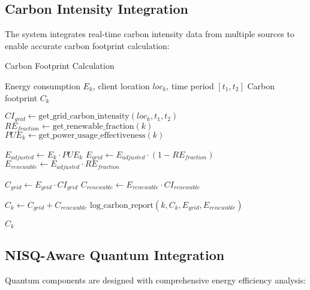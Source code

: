 \documentclass[10pt,journal,compsoc]{IEEEtran}
\begin{document}
\subsection{Carbon Intensity Integration}

The system integrates real-time carbon intensity data from multiple sources to enable accurate carbon footprint calculation:

\begin{algorithm}[!t]
\caption{Carbon Footprint Calculation}
\label{alg:carbon_footprint}
\begin{algorithmic}[1]
\Require Energy consumption $E_k$, client location $loc_k$, time period $[t_1, t_2]$
\Ensure Carbon footprint $C_k$

\State $CI_{grid} \leftarrow \text{get\_grid\_carbon\_intensity}(loc_k, t_1, t_2)$
\State $RE_{fraction} \leftarrow \text{get\_renewable\_fraction}(k)$
\State $PUE_k \leftarrow \text{get\_power\_usage\_effectiveness}(k)$

\State $E_{adjusted} \leftarrow E_k \cdot PUE_k$
\State $E_{grid} \leftarrow E_{adjusted} \cdot (1 - RE_{fraction})$
\State $E_{renewable} \leftarrow E_{adjusted} \cdot RE_{fraction}$

\State $C_{grid} \leftarrow E_{grid} \cdot CI_{grid}$
\State $C_{renewable} \leftarrow E_{renewable} \cdot CI_{renewable}$ 

\State $C_k \leftarrow C_{grid} + C_{renewable}$
\State $\text{log\_carbon\_report}(k, C_k, E_{grid}, E_{renewable})$

\State \Return $C_k$
\end{algorithmic}
\end{algorithm}

\subsection{NISQ-Aware Quantum Integration}

Quantum components are designed with comprehensive energy efficiency analysis:
\end{document}
